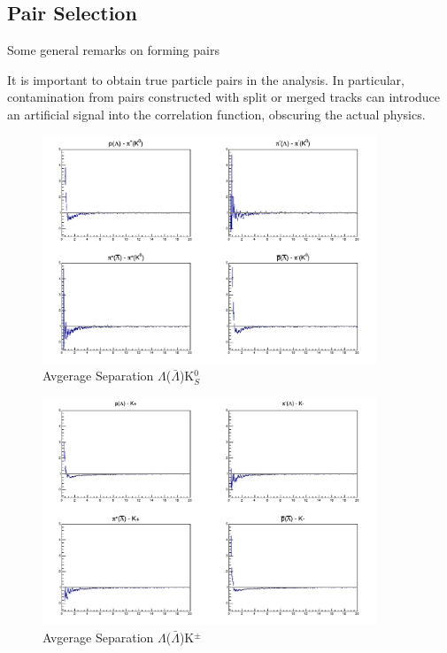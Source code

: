 \subsection{Pair Selection}
\label{PairSelection}

Some general remarks on forming pairs

It is important to obtain true particle pairs in the analysis.  In particular, contamination from pairs constructed with split or merged tracks can introduce an artificial signal into the correlation function, obscuring the actual physics.

\begin{figure}[h]
  \centering
  \includegraphics[width=100mm]{3_DataSelection/Figures/AvgSepCFs_LamK0.pdf}
  \caption[Avgerage Separation $\Lambda$($\bar{\Lambda}$)K$^{0}_{S}$]{Avgerage Separation $\Lambda$($\bar{\Lambda}$)K$^{0}_{S}$}
  \label{fig:AvgSepLamK0}
\end{figure}

\begin{figure}[h]
  \centering
  \includegraphics[width=100mm]{3_DataSelection/Figures/AvgSepCFs_LamKch.pdf}
  \caption[Avgerage Separation $\Lambda$($\bar{\Lambda}$)K$^{\pm}$]{Avgerage Separation $\Lambda$($\bar{\Lambda}$)K$^{\pm}$}
  \label{fig:AvgSepLamKch}
\end{figure}